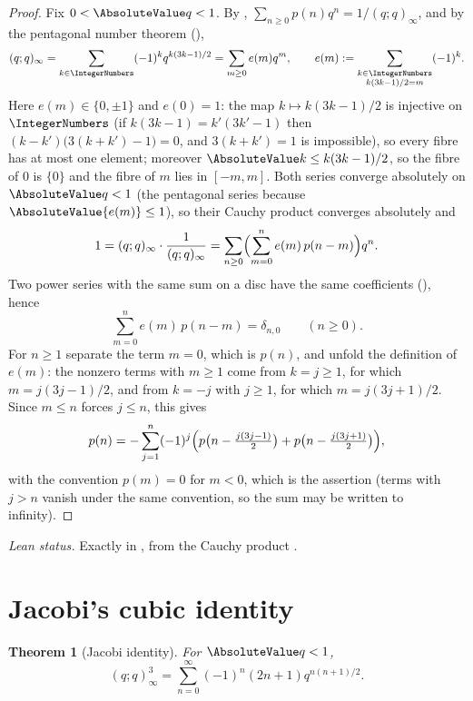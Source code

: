 \documentclass[11pt,a4paper,oneside,openany]{book}
\newtheorem{theorem}{Theorem}[chapter]
\theoremstyle{definition}
\theoremstyle{remark}
\begin{document}
\begin{proof}
Fix $0<\AbsoluteValue q<1$.  By ,
$\sum_{n\ge0}p(n)q^n=1/(q;q)_\infty$, and by the pentagonal number theorem
(),
\[
 (q;q)_\infty=\sum_{k\in\IntegerNumbers}(-1)^kq^{k(3k-1)/2}
 =\sum_{m\ge0}e(m)q^m,
 \qquad
 e(m):=\sum_{\substack{k\in\IntegerNumbers\\ k(3k-1)/2=m}}(-1)^k .
\]
Here $e(m)\in\{0,\pm1\}$ and $e(0)=1$: the map $k\mapsto k(3k-1)/2$ is
injective on $\IntegerNumbers$ (if $k(3k-1)=k'(3k'-1)$ then
$(k-k')\bigl(3(k+k')-1\bigr)=0$, and $3(k+k')=1$ is impossible), so every
fibre has at most one element; moreover $\AbsoluteValue k\le k(3k-1)/2$, so the
fibre of $0$ is $\{0\}$ and the fibre of $m$ lies in $[-m,m]$.  Both series converge
absolutely on $\AbsoluteValue q<1$ (the pentagonal series because
$\AbsoluteValue{e(m)}\le1$), so their Cauchy product converges absolutely and
\[
 1=(q;q)_\infty\cdot\frac1{(q;q)_\infty}
 =\sum_{n\ge0}\Bigl(\sum_{m=0}^{n}e(m)\,p(n-m)\Bigr)q^n .
\]
Two power series with the same sum on a disc have the same coefficients
(), hence
\[
 \sum_{m=0}^{n}e(m)\,p(n-m)=\delta_{n,0}\qquad(n\ge0).
\]
For $n\ge1$ separate the term $m=0$, which is $p(n)$, and unfold the definition
of $e(m)$: the nonzero terms with $m\ge1$ come from $k=j\ge1$, for which
$m=j(3j-1)/2$, and from $k=-j$ with $j\ge1$, for which $m=j(3j+1)/2$.  Since
$m\le n$ forces $j\le n$, this gives
\[
 p(n)=-\sum_{j=1}^{n}(-1)^j
 \Bigl(p\bigl(n-\tfrac{j(3j-1)}2\bigr)+p\bigl(n-\tfrac{j(3j+1)}2\bigr)\Bigr),
\]
with the convention $p(m)=0$ for $m<0$, which is the assertion (terms with
$j>n$ vanish under the same convention, so the sum may be written to
infinity).
\end{proof}

\emph{Lean status.}  Exactly  in
, from the Cauchy product
.


\section{Jacobi's cubic identity}

\begin{theorem}[Jacobi identity]\label{thm:jacobi-cubic}
For $\AbsoluteValue q<1$,
\[
 (q;q)_\infty^3
 =\sum_{n=0}^{\infty}(-1)^n(2n+1)q^{n(n+1)/2}.
\]
\end{theorem}
\end{document}
